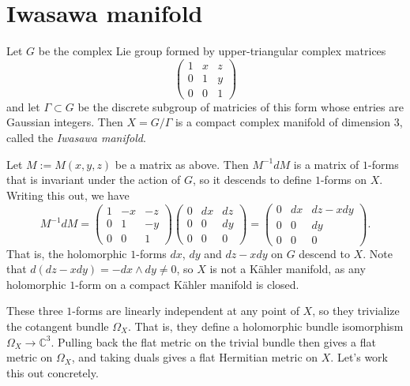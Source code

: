 \documentclass[10pt,a4paper]{article}
\newcommand{\kk}[1]{\mathbb{#1}}
\begin{document}
\section{Iwasawa manifold}
\label{sec:orgd67c2ff}

Let $G$ be the complex Lie group formed by upper-triangular complex matrices
$$
\begin{pmatrix}
  1 & x & z
  \\
  0 & 1 & y
  \\
  0 & 0 & 1
\end{pmatrix}
$$
and let $\Gamma \subset G$ be the discrete subgroup of matricies of this form whose entries are Gaussian integers. Then $X = G / \Gamma$ is a compact complex manifold of dimension $3$, called the \emph{Iwasawa manifold}.

Let $M := M(x,y,z)$ be a matrix as above. Then $M^{-1}dM$ is a matrix of $1$-forms that is invariant under the action of $G$, so it descends to define $1$-forms on $X$. Writing this out, we have
$$
M^{-1}dM
= \begin{pmatrix}
  1 & -x & -z
  \\
  0 & 1 & -y
  \\
  0 & 0 & 1
\end{pmatrix}
\begin{pmatrix}
  0 & dx & dz
  \\
  0 & 0 & dy
  \\
  0 & 0 & 0
\end{pmatrix}
=
\begin{pmatrix}
  0 & dx & dz - x dy
  \\
  0 & 0 & dy
  \\
  0 & 0 & 0
\end{pmatrix}.
$$
That is, the holomorphic $1$-forms $dx$, $dy$ and $dz - x dy$ on $G$ descend to $X$. Note that $d(dz - xdy) = -dx \wedge dy \not= 0$, so $X$ is not a K\"ahler manifold, as any holomorphic $1$-form on a compact K\"ahler manifold is closed.

These three $1$-forms are linearly independent at any point of $X$, so they trivialize the cotangent bundle $\Omega_X$. That is, they define a holomorphic bundle isomorphism $\Omega_X \to \kk C^3$. Pulling back the flat metric on the trivial bundle then gives a flat metric on $\Omega_X$, and taking duals gives a flat Hermitian metric on $X$. Let's work this out concretely.
\end{document}
